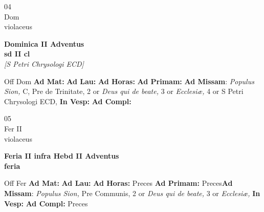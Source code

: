 \documentclass[10pt, openany]{book}
\begin{document}
        \begin{center}
            \begin{minipage}{3.5in}
                \vspace{2em}
                \begin{minipage}{0.5in}
                    {\Huge 04} \\
                    {\normalsize Dom} \\
                    {\normalsize violaceus}
                \end{minipage}
                \begin{minipage}{3.0in}
                    \textbf{ \large Dominica II Adventus \\
                    \textnormal{\normalsize sd II cl}} \\ \textit{[S Petri Chrysologi ECD]} \\ 
                \end{minipage}
                \begin{justify}Off Dom
                    \textbf{Ad Mat: }
                    \textbf{Ad Lau: }
                    \textbf{Ad Horas: }
                    \textbf{Ad Primam: }\textbf{Ad Missam}: \textit{Populus Sion,} C, Pre de Trinitate, 2 or \textit{Deus qui de beate,} 3 or \textit{Ecclesiæ,} 4 or S Petri Chrysologi ECD,  
                    \textbf{In Vesp: }
                    \textbf{Ad Compl: }
                \end{justify}
            \end{minipage}
        \end{center}
    
        \begin{center}
            \begin{minipage}{3.5in}
                \vspace{2em}
                \begin{minipage}{0.5in}
                    {\Huge 05} \\
                    {\normalsize Fer II} \\
                    {\normalsize violaceus}
                \end{minipage}
                \begin{minipage}{3.0in}
                    \textbf{ \large Feria II infra Hebd II Adventus \\
                    \textnormal{\normalsize feria}} \\ 
                \end{minipage}
                \begin{justify}Off Fer
                    \textbf{Ad Mat: }
                    \textbf{Ad Lau: }
                    \textbf{Ad Horas: }Preces
                    \textbf{Ad Primam: }Preces\textbf{Ad Missam}: \textit{Populus Sion,} Pre Communis, 2 or \textit{Deus qui de beate,} 3 or \textit{Ecclesiæ,}  
                    \textbf{In Vesp: }
                    \textbf{Ad Compl: }Preces
                \end{justify}
            \end{minipage}
        \end{center}
    
\end{document}
